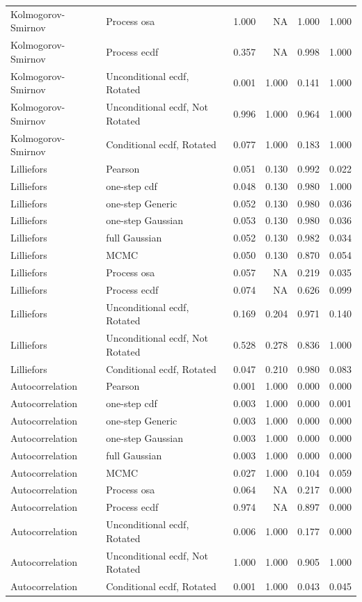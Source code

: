 \documentclass[
]{article}
\begin{document}
\begin{table}[H]
\begin{tabular}[t]{llrrrr}
Kolmogorov- Smirnov & Process osa & 1.000 & NA & 1.000 & 1.000\\
Kolmogorov- Smirnov & Process ecdf & 0.357 & NA & 0.998 & 1.000\\
Kolmogorov- Smirnov & Unconditional ecdf, Rotated & 0.001 & 1.000 & 0.141 & 1.000\\
\addlinespace
Kolmogorov- Smirnov & Unconditional ecdf, Not Rotated & 0.996 & 1.000 & 0.964 & 1.000\\
Kolmogorov- Smirnov & Conditional ecdf, Rotated & 0.077 & 1.000 & 0.183 & 1.000\\
Lilliefors & Pearson & 0.051 & 0.130 & 0.992 & 0.022\\
Lilliefors & one-step cdf & 0.048 & 0.130 & 0.980 & 1.000\\
Lilliefors & one-step Generic & 0.052 & 0.130 & 0.980 & 0.036\\
\addlinespace
Lilliefors & one-step Gaussian & 0.053 & 0.130 & 0.980 & 0.036\\
Lilliefors & full Gaussian & 0.052 & 0.130 & 0.982 & 0.034\\
Lilliefors & MCMC & 0.050 & 0.130 & 0.870 & 0.054\\
Lilliefors & Process osa & 0.057 & NA & 0.219 & 0.035\\
Lilliefors & Process ecdf & 0.074 & NA & 0.626 & 0.099\\
\addlinespace
Lilliefors & Unconditional ecdf, Rotated & 0.169 & 0.204 & 0.971 & 0.140\\
Lilliefors & Unconditional ecdf, Not Rotated & 0.528 & 0.278 & 0.836 & 1.000\\
Lilliefors & Conditional ecdf, Rotated & 0.047 & 0.210 & 0.980 & 0.083\\
Autocorrelation & Pearson & 0.001 & 1.000 & 0.000 & 0.000\\
Autocorrelation & one-step cdf & 0.003 & 1.000 & 0.000 & 0.001\\
\addlinespace
Autocorrelation & one-step Generic & 0.003 & 1.000 & 0.000 & 0.000\\
Autocorrelation & one-step Gaussian & 0.003 & 1.000 & 0.000 & 0.000\\
Autocorrelation & full Gaussian & 0.003 & 1.000 & 0.000 & 0.000\\
Autocorrelation & MCMC & 0.027 & 1.000 & 0.104 & 0.059\\
Autocorrelation & Process osa & 0.064 & NA & 0.217 & 0.000\\
\addlinespace
Autocorrelation & Process ecdf & 0.974 & NA & 0.897 & 0.000\\
Autocorrelation & Unconditional ecdf, Rotated & 0.006 & 1.000 & 0.177 & 0.000\\
Autocorrelation & Unconditional ecdf, Not Rotated & 1.000 & 1.000 & 0.905 & 1.000\\
Autocorrelation & Conditional ecdf, Rotated & 0.001 & 1.000 & 0.043 & 0.045\\
\bottomrule
\end{tabular}
\end{table}
\end{document}
